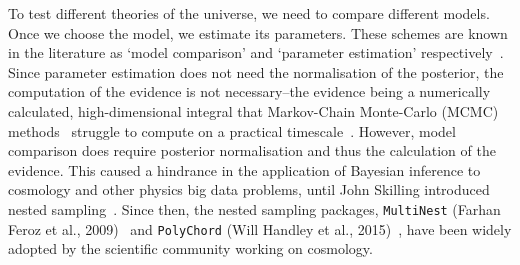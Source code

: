 To test different theories of the universe, we need to compare different models. Once we choose the model, we estimate its parameters. These schemes are known in the literature as `model comparison' and `parameter estimation' respectively~\cite{Bernardo94}. Since parameter estimation does not need the normalisation of the posterior, the computation of the evidence is not necessary--the evidence being a numerically calculated, high-dimensional integral that Markov-Chain Monte-Carlo (MCMC) methods~\cite{mackay2003information} struggle to compute on a practical timescale~\cite{10.1214/06-BA127}. However, model comparison does require posterior normalisation and thus the calculation of the evidence. This caused a hindrance in the application of Bayesian inference to cosmology and other physics big data problems, until John Skilling introduced nested sampling~\cite{10.1214/06-BA127}. Since then, the nested sampling packages, \texttt{MultiNest} (Farhan Feroz et al., 2009)~\cite{Feroz_2009} and \texttt{PolyChord} (Will Handley et al., 2015)~\cite{Handley_2015}, have been widely adopted by the scientific community working on cosmology.


